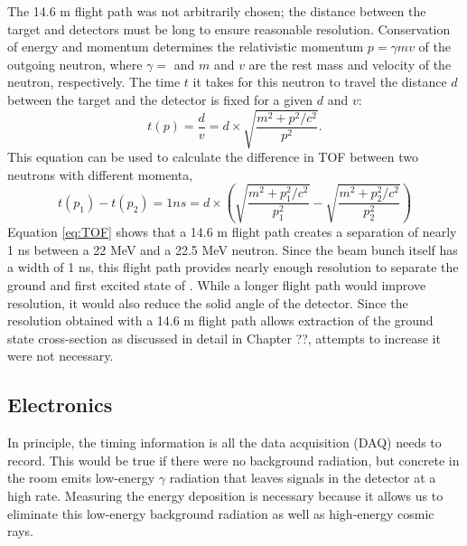 The 14.6 m flight path was not arbitrarily chosen; the distance between the target and detectors must be long to ensure reasonable resolution.  Conservation of energy and momentum determines the relativistic momentum $p = \gamma m v$ of the outgoing neutron, where $\gamma=$ and $m$ and $v$ are the rest mass and velocity of the neutron, respectively.  The time $t$ it takes for this neutron to travel the distance $d$ between the target and the detector is fixed for a given $d$ and $v$:
\begin{equation}
t(p) = \frac{d}{v} = d\times\sqrt{\frac{m^2+p^2/c^2}{p^2}}.
\end{equation}
This equation can be used to calculate the difference in TOF between two neutrons with different momenta,
\begin{equation}
t(p_1) - t(p_2) = 1 ns = d\times(\sqrt{\frac{m^2+p_1^2/c^2}{p_1^2}}-\sqrt{\frac{m^2+p_2^2/c^2}{p_2^2}})
\label{eq:TOF}
\end{equation}
Equation \ref{eq:TOF} shows that a 14.6 m flight path creates a separation of nearly 1 ns between a 22 MeV and a 22.5 MeV neutron.  Since the beam bunch itself has a width of 1 ns, this flight path provides nearly enough resolution to separate the ground and first excited state of \GeTargets. While a longer flight path would improve resolution, it would also reduce the solid angle of the detector.  Since the resolution obtained with a 14.6 m flight path allows extraction of the ground state cross-section as discussed in detail in Chapter ??, attempts to increase it were not necessary.


\subsection{Electronics}

In principle, the timing information is all the data acquisition (DAQ) needs to record.  This would be true if there were no background radiation, but concrete in the room emits low-energy $\gamma$ radiation that leaves signals in the detector at a high rate.  Measuring the energy deposition is necessary because it allows us to eliminate this low-energy background radiation as well as high-energy cosmic rays.

